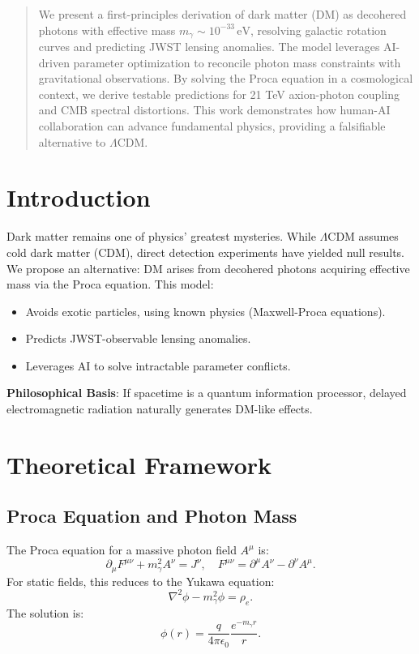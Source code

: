 \documentclass[12pt, a4paper]{article}
\begin{document}
\begin{abstract}  
We present a first-principles derivation of dark matter (DM) as decohered photons with effective mass \( m_\gamma \sim 10^{-33} \, \text{eV} \), resolving galactic rotation curves and predicting JWST lensing anomalies. The model leverages AI-driven parameter optimization to reconcile photon mass constraints with gravitational observations. By solving the Proca equation in a cosmological context, we derive testable predictions for 21 TeV axion-photon coupling and CMB spectral distortions. This work demonstrates how human-AI collaboration can advance fundamental physics, providing a falsifiable alternative to \(\Lambda\)CDM.  
\end{abstract}  

\section{Introduction}  
\label{sec:intro}  

Dark matter remains one of physics' greatest mysteries. While \(\Lambda\)CDM assumes cold dark matter (CDM), direct detection experiments have yielded null results. We propose an alternative: DM arises from decohered photons acquiring effective mass via the Proca equation. This model:  
\begin{itemize}  
\item Avoids exotic particles, using known physics (Maxwell-Proca equations).  
\item Predicts JWST-observable lensing anomalies.  
\item Leverages AI to solve intractable parameter conflicts.  
\end{itemize}  

\textbf{Philosophical Basis}: If spacetime is a quantum information processor, delayed electromagnetic radiation naturally generates DM-like effects.  

\section{Theoretical Framework}  
\label{sec:theory}  

\subsection{Proca Equation and Photon Mass}  
\label{subsec:proca}  

The Proca equation for a massive photon field \( A^\mu \) is:  
\begin{equation}  
\partial_\mu F^{\mu\nu} + m_\gamma^2 A^\nu = J^\nu, \quad F^{\mu\nu} = \partial^\mu A^\nu - \partial^\nu A^\mu.  
\label{eq:proca}  
\end{equation}  
For static fields, this reduces to the Yukawa equation:  
\begin{equation}  
\nabla^2 \phi - m_\gamma^2 \phi = \rho_e.  
\label{eq:yukawa}  
\end{equation}  
The solution is:  
\begin{equation}  
\phi(r) = \frac{q}{4\pi \epsilon_0} \frac{e^{-m_\gamma r}}{r}.  
\label{eq:yukawa_sol}  
\end{equation}  
\end{document}
